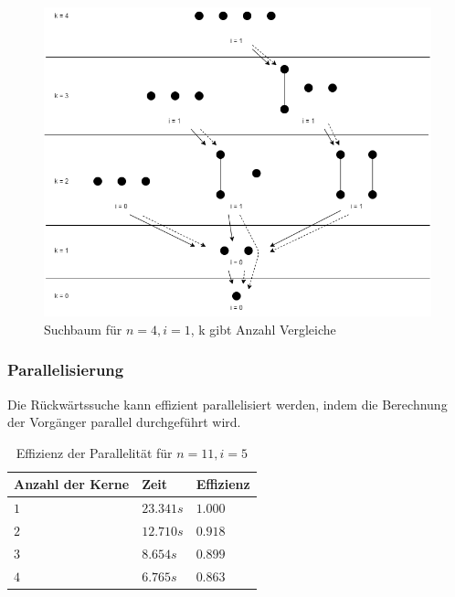 \documentclass[10pt,journal,compsoc]{IEEEtran}
\begin{document}
\begin{figure}[h!]
  \centering
  \includegraphics[width=\columnwidth]{figures/backward-search-tree.png}
  \caption{Suchbaum für $n = 4, i = 1$, k gibt Anzahl Vergleiche}
  \label{fig:backward-search-tree}
\end{figure}



\subsubsection{Parallelisierung} \label{sec:backward:parallelisation}
Die Rückwärtssuche kann effizient parallelisiert werden, indem die Berechnung der Vorgänger parallel durchgeführt wird.

\begin{table}
  \begin{tabular}{l|l|l}
    Anzahl der Kerne & Zeit      & Effizienz \\
    \hline
    $1$              & $23.341s$ & $1.000$   \\
    $2$              & $12.710s$ & $0.918$   \\
    $3$              & $8.654s$  & $0.899$   \\
    $4$              & $6.765s$  & $0.863$   \\
  \end{tabular}
  \centering
  \caption{Effizienz der Parallelität für $n = 11, i = 5$}
  \label{table:backward-parallel}
\end{table}
\end{document}
